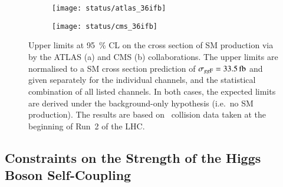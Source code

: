 \begin{figure}[htbp]
  \centering

  \begin{subfigure}[b]{0.9\textwidth}
    \centering

    \texttt{[image: status/atlas\_36ifb]}

  \end{subfigure}

  \vspace{0.5em}

  \begin{subfigure}[b]{0.9\textwidth}
    \centering

    \texttt{[image: status/cms\_36ifb]}

  \end{subfigure}

  \caption[Upper limits on the SM~\HH production cross section by the ATLAS and
  CMS collaborations at the beginning of Run~2 of the LHC.]{Upper limits at
    \SI{95}{\percent} CL on the cross section of SM \HH production via \ggF by
    the ATLAS (a) and CMS (b) collaborations. The upper limits are normalised to
    a SM cross section prediction of $\sigma_{\ggF} = \SI{33.5}{\femto\barn}$
    and given separately for the individual channels, and the statistical
    combination of all listed channels. In both cases, the expected limits are
    derived under the background-only hypothesis (i.e.\ no SM \HH
    production). The results are based on \pp~collision data taken at the
    beginning of Run~2 of the LHC.}%
  \label{fig:prior_status_smhh}
\end{figure}


\subsection*{Constraints on the Strength of the Higgs Boson Self-Coupling}%
\label{sec:past_results_klambda}

